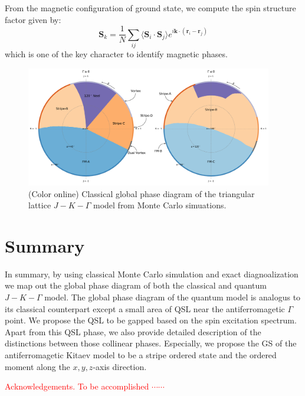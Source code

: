 \documentclass[aps,prb,reprint,amsfonts,amsmath,amssymb,showpacs,groupedaddress,superscriptaddress]{revtex4-1}
\begin{document}
From the magnetic configuration of ground state, we compute the spin structure factor given by:
\begin{equation}
    \mathbf{S}_k = \frac{1}{N} \sum_{ij} \langle \mathbf{S}_i \cdot \mathbf{S}_j \rangle e^{i \mathbf{k} \cdot (\mathbf{r}_i - \mathbf{r}_j)}
\end{equation}
which is one of the key character to identify magnetic phases.

\begin{figure}
    \centering
    \includegraphics[width=0.96\textwidth]{Fig6.pdf}
    \caption{\label{fig:ClassicalPhaseDiagram}(Color online) Classical global phase diagram of the triangular lattice $J-K-\Gamma$ model from Monte Carlo simuations.}
\end{figure}

\section{\label{sec:SectionVI}Summary}
In summary, by using classical Monte Carlo simulation and exact diagnoalization we map out the global phase diagram of both the classical and quantum $J-K-\Gamma$ model. The global phase diagram of the quantum model is analogus to its classical counterpart except a small area of QSL near the antiferromagetic $\Gamma$ point. We propose the QSL to be gapped based on the spin excitation spectrum. Apart from this QSL phase, we also provide detailed description of the distinctions between those collinear phases. Especially, we propose the GS of the antiferromagetic Kitaev model to be a stripe ordered state and the ordered moment along the $x, y, z$-axis direction.

\begin{acknowledgments}
    \textcolor{red}{Acknowledgements.  To be accomplished $\cdots \cdots$}
\end{acknowledgments}
\end{document}
